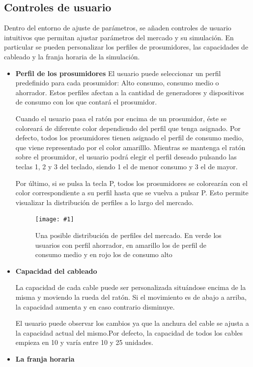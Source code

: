 \documentclass[12pt,a4paper,openright,oneside]{article}
\newcommand{\includeImage}[3]
{
	\begin{figure}[H]
	\begin{center}
	\texttt{[image: \#1]}
	\end{center}
	\caption{#3}
	\end{figure}
}
\numberwithin{equation}{section}
\theoremstyle{definition}
\begin{document}
\subsection{Controles de usuario}

Dentro del entorno de ajuste de parámetros, se añaden controles de usuario intuitivos que permitan ajustar parámetros del mercado y su simulación. En particular se pueden personalizar los perfiles de prosumidores, las capacidades de cableado y la franja horaria de la simulación.

\begin{itemize}
\item \textbf{Perfil de los prosumidores}
El usuario puede seleccionar un perfil predefinido para cada prosumidor: Alto consumo, consumo medio o ahorrador. Estos perfiles afectan a la cantidad de generadores y dispositivos de consumo con los que contará el prosumidor. 

Cuando el usuario pasa el ratón por encima de un prosumidor, éste se coloreará de diferente color dependiendo del perfil que tenga asignado. Por defecto, todos los prosumidores tienen asignado el perfil de consumo medio, que viene representado por el color amarilllo. Mientras se mantenga el ratón sobre el prosumidor, el usuario podrá elegir el perfil deseado pulsando las teclas 1, 2 y 3 del teclado, siendo 1 el de menor consumo y 3 el de mayor. 

Por último, si se pulsa la tecla P, todos los prosumidores se colorearán con el color correspondiente a su perfil hasta que se vuelva a pulsar P. Esto permite visualizar la distribución de perfiles a lo largo del mercado.

\includeImage{perfiles.png}{10}{Una posible distribución de perfiles del mercado. En verde los usuarios con perfil ahorrador, en amarillo los de perfil de consumo medio y en rojo los de consumo alto}

\item \textbf{Capacidad del cableado}

La capacidad de cada cable puede ser personalizada situándose encima de la misma y moviendo la rueda del ratón. Si el movimiento es de abajo a arriba, la capacidad aumenta y en caso contrario disminuye. 

El usuario puede observar los cambios ya que la anchura del cable se ajusta a la capacidad actual del mismo.Por defecto, la capacidad de todos los cables empieza en 10 y varía entre 10 y 25 unidades.


\item \textbf{La franja horaria}


\end{itemize}
\end{document}
